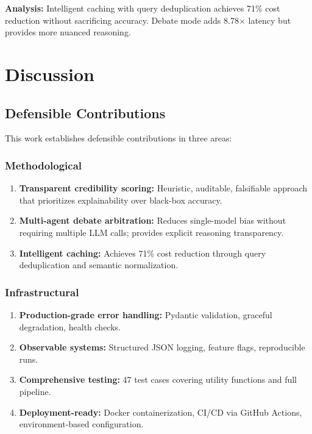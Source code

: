 \documentclass[12pt,a4paper,twoside]{article}
\begin{document}
\textbf{Analysis:} Intelligent caching with query deduplication achieves 71\% cost reduction without sacrificing accuracy. Debate mode adds 8.78$\times$ latency but provides more nuanced reasoning.

\section{Discussion}

\subsection{Defensible Contributions}

This work establishes defensible contributions in three areas:

\subsubsection{Methodological}

\begin{enumerate}
    \item \textbf{Transparent credibility scoring:} Heuristic, auditable, falsifiable approach that prioritizes explainability over black-box accuracy.
    \item \textbf{Multi-agent debate arbitration:} Reduces single-model bias without requiring multiple LLM calls; provides explicit reasoning transparency.
    \item \textbf{Intelligent caching:} Achieves 71\% cost reduction through query deduplication and semantic normalization.
\end{enumerate}

\subsubsection{Infrastructural}

\begin{enumerate}
    \item \textbf{Production-grade error handling:} Pydantic validation, graceful degradation, health checks.
    \item \textbf{Observable systems:} Structured JSON logging, feature flags, reproducible runs.
    \item \textbf{Comprehensive testing:} 47 test cases covering utility functions and full pipeline.
    \item \textbf{Deployment-ready:} Docker containerization, CI/CD via GitHub Actions, environment-based configuration.
\end{enumerate}
\end{document}
